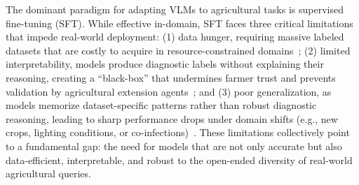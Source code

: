 \documentclass[11pt]{article}
\begin{document}
The dominant paradigm for adapting VLMs to agricultural tasks is supervised fine-tuning (SFT). While effective in-domain, SFT faces three critical limitations that impede real-world deployment: (1) data hunger, requiring massive labeled datasets that are costly to acquire in resource-constrained domains~\cite{liu2024multimodal}; (2) limited interpretability, models produce diagnostic labels without explaining their reasoning, creating a ``black-box'' that undermines farmer trust and prevents validation by agricultural extension agents~\cite{zhi2025medgr,chu2025sft}; and (3) poor generalization, as models memorize dataset-specific patterns rather than robust diagnostic reasoning, leading to sharp performance drops under domain shifts (e.g., new crops, lighting conditions, or co-infections)~\cite{pan2025medvlm,wu2023laboratory,nanavaty2024integrating,chen2025sft}. %
These limitations collectively point to a fundamental gap: the need for models that are not only accurate but also data-efficient, interpretable, and robust to the open-ended diversity of real-world agricultural queries.
\end{document}
